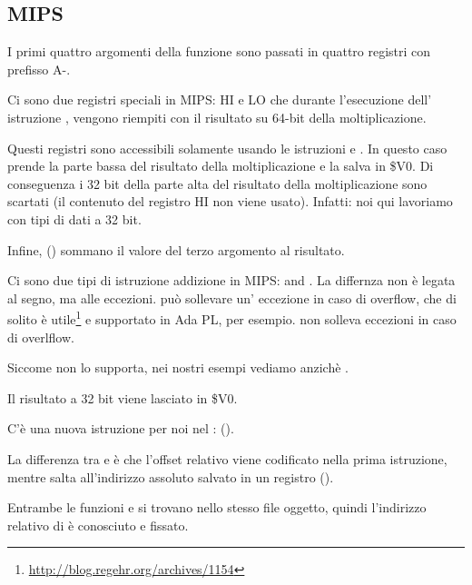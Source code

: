 \subsection{MIPS}



I primi quattro argomenti della funzione sono passati in quattro registri con prefisso A-.


Ci sono due registri speciali in MIPS: HI e LO che durante l'esecuzione dell' istruzione , vengono riempiti con il risultato su 64-bit della moltiplicazione.

Questi registri sono accessibili solamente usando le istruzioni  e .
In questo caso  prende la parte bassa del risultato della moltiplicazione e la salva in \$V0.
Di conseguenza i 32 bit della parte alta del risultato della moltiplicazione sono scartati (il contenuto del registro HI non viene usato).
Infatti: noi qui lavoriamo con tipi di dati \Tint a 32 bit.


Infine,  () sommano il valore del terzo argomento al risultato.


Ci sono due tipi di istruzione addizione in MIPS:  and .
La differnza non è legata al segno, ma alle eccezioni.  può sollevare un' eccezione in caso di overflow, che di solito è utile\footnote{\url{http://blog.regehr.org/archives/1154}} e supportato in Ada \ac{PL}, per esempio.
 non solleva eccezioni in caso di overlflow.

Siccome \CCpp non lo supporta, nei nostri esempi vediamo  anzichè .

Il risultato a 32 bit viene lasciato in \$V0.


C'è una nuova istruzione per noi nel \main:  (). 

La differenza tra  e  è che l'offset relativo viene codificato nella prima istruzione, 
mentre  salta all'indirizzo assoluto salvato in un registro ().

Entrambe le funzioni \ttf e \main si trovano nello stesso file oggetto, quindi l'indirizzo relativo di \ttf è conosciuto e fissato.
